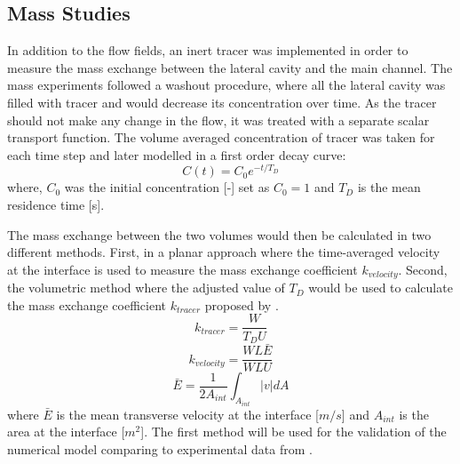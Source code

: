 \documentclass[../main.tex]{subfiles}
\begin{document}
\subsection{Mass Studies}
In addition to the flow fields, an inert tracer was implemented in order to measure the mass exchange between the lateral cavity and the main channel. The mass experiments followed a washout procedure, where all the lateral cavity was filled with tracer and would decrease its concentration over time. As the tracer should not make any change in the flow, it was treated with a separate scalar transport function. The volume averaged concentration of tracer was taken for each time step and later modelled in a first order decay curve:
\begin{equation}
C(t)=C_0e^{-t/T_D}
\end{equation}
where, $C_0$ was the initial concentration [-] set as $C_0=1$ and $T_D$ is the mean residence time [s].

The mass exchange between the two volumes would then be calculated in two different methods. First, in a planar approach where the time-averaged velocity at the interface is used to measure the mass exchange coefficient $k_{velocity}$. Second, the volumetric method where the adjusted value of $T_D$ would be used to calculate the mass exchange coefficient $k_{tracer}$ proposed by \textcite{weitbrecht2001}.
\begin{equation}
k_{tracer}=\frac{W}{T_D U}
\end{equation}
\begin{equation}
k_{velocity}=\frac{W L \bar{E}}{W L U}
\end{equation}
\begin{equation}
\bar{E}=\frac{1}{2A_{int}}\int_{A_{int}}|v| dA
\end{equation}
where $\bar{E}$ is the mean transverse velocity at the interface [$m/s$] and $A_{int}$ is the area at the interface [$m^2$]. The first method will be used for the validation of the numerical model comparing to experimental data from \textcite{xiang2019}.
\end{document}
